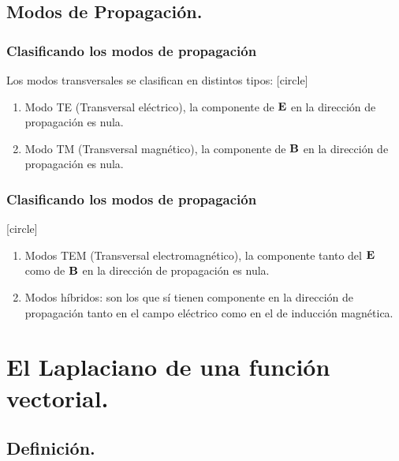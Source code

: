 \documentclass[12pt]{beamer}
\begin{document}
\subsection{Modos de Propagación.}

\begin{frame}
\frametitle{Clasificando los modos de propagación}
Los modos transversales se clasifican en distintos tipos:
[circle]
\begin{enumerate}[<+->]
\item Modo TE (Transversal eléctrico), la componente de $\vb{E}$ en la dirección de propagación es nula.
\item Modo TM (Transversal magnético), la componente de $\vb{B}$ en la dirección de propagación es nula.
\seti
\end{enumerate}
\end{frame}
\begin{frame}
\frametitle{Clasificando los modos de propagación}
[circle]
\begin{enumerate}[<+->]
\conti
\item Modos TEM (Transversal electromagnético), la componente tanto del $\vb{E}$ como de $\vb{B}$ en la dirección de propagación es nula.
\item Modos híbridos: son los que sí tienen componente en la dirección de propagación tanto en el campo eléctrico como en el de inducción magnética.
\end{enumerate}
\end{frame}

\section{El Laplaciano de una función vectorial.}
\subsection{Definición.}
\end{document}
